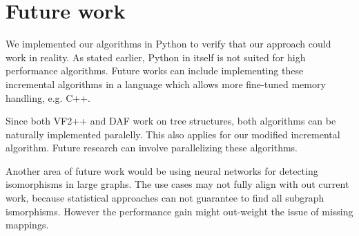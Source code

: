 \chapter{Future work}

We implemented our algorithms in Python to verify that our approach could work in reality. As stated earlier,
Python in itself is not suited for high performance algorithms. Future works can include implementing these
incremental algorithms in a language which allows more fine-tuned memory handling, e.g. C++.

Since both VF2++ and DAF work on tree structures, both algorithms can be naturally implemented paralelly. This
also applies for our modified incremental algorithm. Future research can involve parallelizing these algorithms.

Another area of future work would be using neural networks for detecting isomorphisms in large graphs. The use 
cases may not fully align with out current work, because statistical approaches can not guarantee to find all
subgraph ismorphisms. However the performance gain might out-weight the issue of missing mappings.